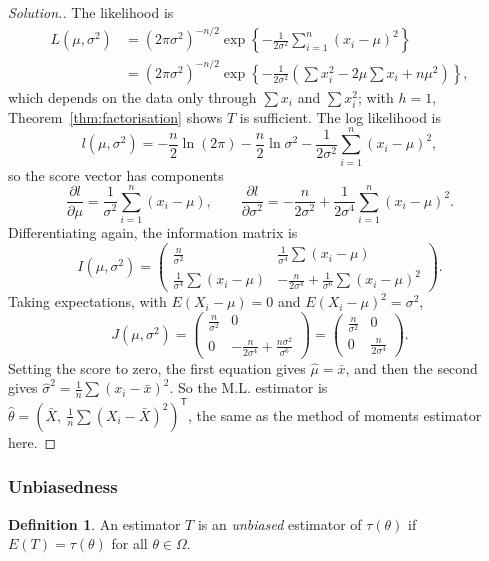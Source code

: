 \documentclass[12pt,a4paper]{report}
\theoremstyle{definition}
\newtheorem{definition}[thm]{Definition}
\theoremstyle{plain}
\newenvironment{solution}
  {\renewcommand{\qedsymbol}{}\begin{proof}[\textit{Solution}.]}
  {\end{proof}}
\begin{document}
\begin{solution}
The likelihood is
\begin{align*}
L(\mu, \sigma^2) &= \left(2\pi \sigma^2\right)^{-n/2} \exp\left\{-\frac{1}{2\sigma^2}
\sum^n_{i = 1} (x_i - \mu)^2\right\}\\
&= \left(2\pi\sigma^2\right)^{-n/2}
\exp\left\{-\frac{1}{2\sigma^2}\left(\sum x^2_i - 2\mu\sum x_i +
n\mu^2\right)\right\},
\end{align*}
which depends on the data only through $\sum x_i$ and $\sum x_i^2$; with $h = 1$,
Theorem~\ref{thm:factorisation} shows $T$ is sufficient. The log likelihood is
\[l(\mu, \sigma^2) = -\frac{n}{2}\ln (2\pi) - \frac{n}{2}\ln \sigma^2 -
\frac{1}{2\sigma^2}\sum^n_{i = 1}(x_i - \mu)^2 ,\]
so the score vector has components
\[\frac{\partial l}{\partial \mu} = \frac{1}{\sigma^2}\sum^n_{i = 1}(x_i - \mu)
,\qquad \frac{\partial l}{\partial \sigma^2} = -\frac{n}{2\sigma^2} +
\frac{1}{2\sigma^4}\sum^n_{i = 1}(x_i - \mu)^2 .\]
Differentiating again, the information matrix is
\[I(\mu,\sigma^2) = \begin{pmatrix}
\frac{n}{\sigma^2} & \frac{1}{\sigma^4}\sum(x_i - \mu)\\[1ex]
\frac{1}{\sigma^4}\sum(x_i - \mu) & -\frac{n}{2\sigma^4} +
\frac{1}{\sigma^6}\sum(x_i - \mu)^2
\end{pmatrix}.\]
Taking expectations, with $E(X_i - \mu) = 0$ and $E(X_i - \mu)^2 = \sigma^2$,
\[J(\mu,\sigma^2) = \begin{pmatrix}
\frac{n}{\sigma^2} & 0\\[1ex]
0 & -\frac{n}{2\sigma^4} + \frac{n\sigma^2}{\sigma^6}
\end{pmatrix} = \begin{pmatrix}
\frac{n}{\sigma^2} & 0\\[1ex]
0 & \frac{n}{2\sigma^4}
\end{pmatrix}.\]
Setting the score to zero, the first equation gives $\hat{\mu} = \bar{x}$, and
then the second gives
$\hat{\sigma}^2 = \frac{1}{n}\sum (x_i - \bar{x})^2$. So the M.L. estimator is
$\hat{\theta} = \left(\bar{X},\ \frac{1}{n}\sum(X_i - \bar{X})^2\right)^{\mathsf T}$,
the same as the method of moments estimator here.
\end{solution}

\subsubsection{Unbiasedness}

\begin{definition}
\label{def:unbiased}
An estimator $T$ is an \emph{unbiased} estimator of $\tau(\theta)$ if
$E(T) = \tau(\theta)$ for all $\theta\in \Omega$.
\end{definition}
\end{document}
